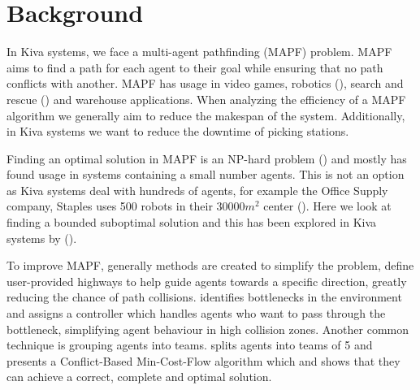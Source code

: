 \documentclass[a4paper,11pt]{article}
\begin{document}
\section{Background}
\label{background}

In Kiva systems, we face a multi-agent pathfinding (MAPF) problem. MAPF aims to find a path for each agent to their goal while ensuring that no path conflicts with another. MAPF has usage in video games, robotics (\cite{bennewitz2002finding}), search and rescue (\cite{konolige2006centibots}) and warehouse applications. When analyzing the efficiency of a MAPF algorithm we generally aim to reduce the makespan of the system. Additionally, in Kiva systems we want to reduce the downtime of picking stations.

Finding an optimal solution in MAPF is an NP-hard problem (\cite{yu2013structure}) and mostly has found usage in systems containing a small number agents. This is not an option as Kiva systems deal with hundreds of agents, for example the Office Supply company, Staples uses 500 robots in their $30000m^{2}$ center (\cite{guizzo2008three}). Here we look at finding a bounded suboptimal solution and this has been explored in Kiva systems by (\cite{cohen2016bounded}).

To improve MAPF, generally methods are created to simplify the problem, \cite{cohen2016bounded} define user-provided highways to help guide agents towards a specific direction, greatly reducing the chance of path collisions. \cite{wilt2014spatially} identifies bottlenecks in the environment and assigns a controller which handles agents who want to pass through the bottleneck, simplifying agent behaviour in high collision zones. Another common technique is grouping agents into teams. \cite{ma2016optimal} splits agents into teams of 5 and presents a Conflict-Based Min-Cost-Flow algorithm which and shows that they can achieve a correct, complete and optimal solution.

\end{document}
